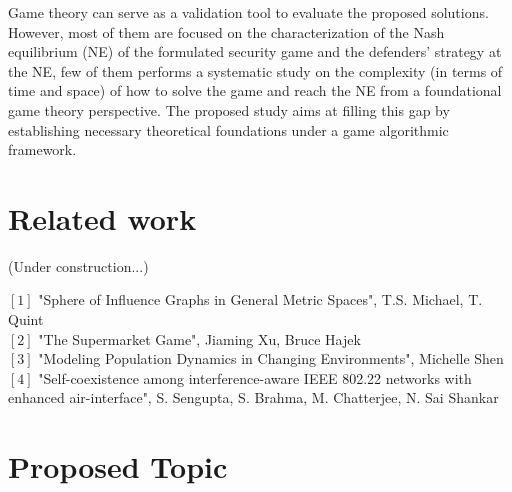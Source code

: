 \documentclass[10pt]{article}
\theoremstyle{definition}
\begin{document}
Game theory can serve as a validation tool to evaluate the proposed solutions.
However, most of them are focused on the characterization of the Nash equilibrium (NE) of the formulated security game and the defenders’ strategy at the NE, few of them performs a systematic study on the
complexity (in terms of time and space) of how to solve the game and reach the
NE from a foundational game theory perspective. The proposed study aims at
filling this gap by establishing necessary theoretical foundations under a game algorithmic framework.



\section{Related work}

(Under construction...)

$[1]$ "Sphere of Influence Graphs in General Metric Spaces", T.S. Michael, T. Quint\\
$[2]$ "The Supermarket Game", Jiaming Xu, Bruce Hajek\\
$[3]$ "Modeling Population Dynamics in Changing Environments", Michelle Shen\\
$[4]$ "Self-coexistence among interference-aware IEEE 802.22 networks with enhanced air-interface", S. Sengupta, S. Brahma, M. Chatterjee, N. Sai Shankar\\

\section{Proposed Topic}
\end{document}
